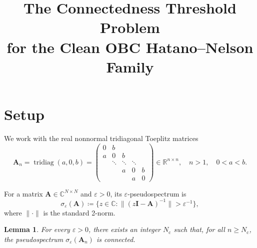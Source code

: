 \documentclass[11pt]{article}
\title{The Connectedness Threshold Problem\\
for the Clean OBC Hatano--Nelson Family}
\author{}
\date{}
\newtheorem{lemma}[theorem]{Lemma}
\newcommand{\C}{\mathbb{C}}
\newcommand{\R}{\mathbb{R}}
\newcommand{\eps}{\varepsilon}
\newcommand{\sig}{\sigma}
\newcommand{\conn}{\mathrm{c}}
\newcommand{\tridiag}{\operatorname{tridiag}}
\newcommand{\matA}{\mathbf{A}}
\newcommand{\matI}{\mathbf{I}}
\begin{document}
\maketitle

\section{Setup}

We work with the real nonnormal tridiagonal Toeplitz matrices
\[
\matA_n=\tridiag(a,0,b)
=\begin{pmatrix}
0 & b \\
a & 0 & b \\
& \ddots & \ddots & \ddots \\
&& a & 0 & b \\
&&& a & 0
\end{pmatrix}
\in\R^{n\times n},
\quad n>1, \quad 0<a<b.
\]

For a matrix $\matA\in\C^{N\times N}$ and $\eps>0$, its $\eps$-pseudospectrum is
\[
\sig_\eps(\matA)\coloneqq\{z\in\C\colon\|(z\matI-\matA)^{-1}\|>\eps^{-1}\},
\]
where $\|\cdot\|$ is the standard 2-norm.

\begin{lemma}\label{lem:eventual-connectedness}
For every $\eps>0$, there exists an integer $N_\conn$ such that, for all
$n\ge N_\conn$, the pseudospectrum $\sig_\eps(\matA_n)$ is connected.
\end{lemma}
\end{document}
